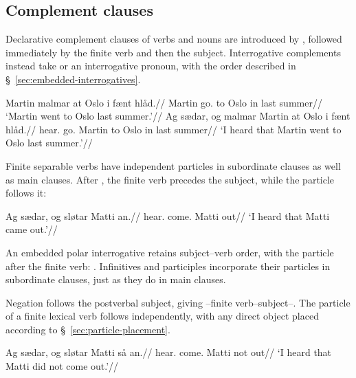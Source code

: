 \subsection{Complement clauses}
\label{sec:complement-clauses}
Declarative complement clauses of verbs and nouns are introduced by , followed immediately by the finite verb and then the subject. Interrogative complements instead take  or an interrogative pronoun, with the order described in \S~\ref{sec:embedded-interrogatives}.

\pex
\begingl
\gla Martin malmar at Oslo i fænt hlåd.//
\glb Martin go.\Pst{} to Oslo in last summer//
\glft `Martin went to Oslo last summer.'//
\endgl
\xe
\pex
\begingl
\gla Ag sædar, og malmar Martin at Oslo i fænt hlåd.//
\glb \First{}\Sg{} hear.\Pst{} \Cmpl{} go.\Pst{} Martin to Oslo in last summer//
\glft `I heard that Martin went to Oslo last summer.'//
\endgl
\xe

Finite separable verbs have independent particles in subordinate clauses as well as main clauses. After , the finite verb precedes the subject, while the particle follows it:

\pex
\begingl
\gla Ag sædar, og sløtar Matti an.//
\glb \First{}\Sg{} hear.\Pst{} \Cmpl{} come.\Pst{} Matti out//
\glft `I heard that Matti came out.'//
\endgl
\xe

An embedded polar interrogative retains subject--verb order, with the particle after the finite verb: . Infinitives and participles incorporate their particles in subordinate clauses, just as they do in main clauses.

Negation follows the postverbal subject, giving --finite verb--subject--. The particle of a finite lexical verb follows independently, with any direct object placed according to \S~\ref{sec:particle-placement}.

\pex
\begingl
\gla Ag sædar, og sløtar Matti så an.//
\glb \First{}\Sg{} hear.\Pst{} \Cmpl{} come.\Pst{} Matti not out//
\glft `I heard that Matti did not come out.'//
\endgl
\xe

